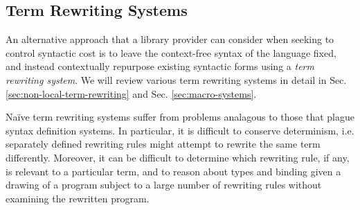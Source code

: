 





\vspace{-6px}\subsection{Term Rewriting Systems}
An alternative approach that a library provider can consider when seeking to control syntactic cost is to leave the context-free syntax of the language fixed, and instead contextually repurpose existing syntactic forms using a \emph{term rewriting system}. We will review various term rewriting systems in detail in Sec. \ref{sec:non-local-term-rewriting} and Sec. \ref{sec:macro-systems}. 

Na\"ive term rewriting systems suffer from problems analagous to those that plague syntax definition systems. In particular, it is difficult to conserve determinism, i.e. separately defined rewriting rules might attempt to rewrite the same term differently. Moreover, it can be difficult to determine which rewriting rule, if any, is relevant to a particular term, and to reason about types and binding given a drawing of a program subject to a large number of rewriting rules without examining the rewritten program.

